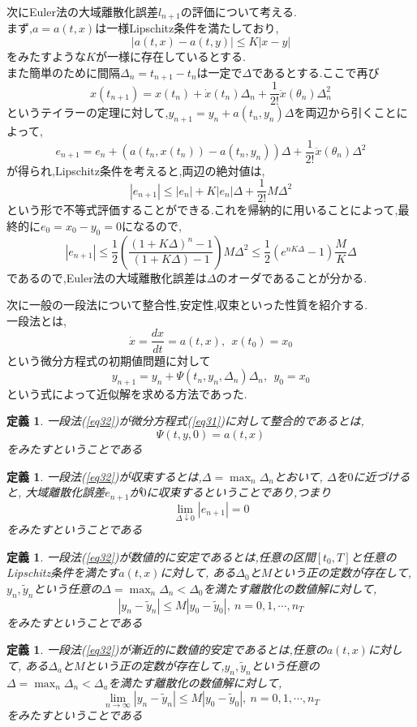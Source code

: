 \documentclass[a4paper]{jreport}
\numberwithin{equation}{section}
\newtheorem{Def}     [Thm]{定義}
\renewenvironment{leftbar}{%
  \def\FrameCommand{\vrule width 1pt \hspace{10pt}}%
  \MakeFramed {\advance\hsize-\width \FrameRestore}}%
 {\endMakeFramed}
\def\defb{\begin{leftbar}\begin{Def}}
\def\defx{\end{Def}\end{leftbar}}
\def\eq{\begin{equation}}
\def\eqx{\end{equation}}
\begin{document}
次にEuler法の大域離散化誤差$l_{n+1}$の評価について考える.\\
まず,$a=a(t,x)$は一様Lipschitz条件を満たしており,
\[
|a(t,x) - a(t,y)| \le K |x-y|
\]
をみたすような$K$が一様に存在しているとする.\\
また簡単のために間隔$\Delta_n = t_{n+1} -t_n$は一定で$\Delta$であるとする.ここで再び
\[
x(t_{n+1}) = x(t_n) + \dot{x}(t_n)\Delta_n + \frac{1}{2!} \ddot{x}(\theta_n)\Delta_n^2
\]
というテイラーの定理に対して,$y_{n+1} = y_n + a(t_n,y_n)\Delta $を両辺から引くことによって,
\[
e_{n+1} = e_n + (a(t_n,x(t_n))-a(t_n,y_n))\Delta + \frac{1}{2!} \ddot{x}(\theta_n)\Delta^2
\]
が得られ,Lipschitz条件を考えると,両辺の絶対値は,
\[
|e_{n+1}| \le |e_n| + K|e_n|\Delta + \frac{1}{2!} M\Delta^2
\]
という形で不等式評価することができる.これを帰納的に用いることによって,最終的に$e_0 = x_0 - y_0 = 0$になるので,
\[
|e_{n+1}| \le \frac{1}{2} \left( \frac{(1+K\Delta)^n -1 }{(1+K\Delta)-1} \right)M\Delta^2 \le
\frac{1}{2} (e^{nK\Delta} -1) \frac{M}{K}\Delta
\]
であるので,Euler法の大域離散化誤差は$\Delta$のオーダであることが分かる.\par
次に一般の一段法について整合性,安定性,収束といった性質を紹介する.\\
一段法とは,
\eq
\label{eq31}
\dot{x} = \frac{dx}{dt} = a(t,x), \  \  x(t_0) = x_0
\eqx
という微分方程式の初期値問題に対して
\eq
\label{eq32}
y_{n+1} = y_n + \Psi(t_n,y_n,\Delta_n) \Delta_n,\  \  y_0 = x_0
\eqx
という式によって近似解を求める方法であった.\\
\defb
一段法(\ref{eq32})が微分方程式(\ref{eq31})に対して整合的であるとは,\\
\[
\Psi(t,y,0)  = a(t,x)
\]
をみたすということである
\defx

\defb
一段法(\ref{eq32})が収束するとは,$\Delta =\max_n \Delta_n$とおいて, $\Delta$を$0$に近づけると,
大域離散化誤差$e_{n+1}$が$0$に収束するということであり,つまり\\
\[
\lim_{\Delta \downarrow 0} |e_{n+1}| = 0
\]
をみたすということである
\defx

\defb
一段法(\ref{eq32})が数値的に安定であるとは,任意の区間$[t_0,T]$と任意のLipschitz条件を満たす$a(t,x)$に対して,
ある$\Delta_0$と$M$という正の定数が存在して,$y_n,\tilde{y}_n$という任意の$\Delta =\max_n \Delta_n < \Delta_0$を満たす離散化の数値解に対して,
\[
|y_n - \tilde{y}_n | \le M |y_0 - \tilde{y}_0| ,\ n = 0,1,\cdots,n_T
\]
をみたすということである
\defx

\defb
一段法(\ref{eq32})が漸近的に数値的安定であるとは,任意の$a(t,x)$に対して,
ある$\Delta_a$と$M$という正の定数が存在して,$y_n,\tilde{y}_n$という任意の$\Delta =\max_n \Delta_n < \Delta_a$を満たす離散化の数値解に対して,
\[
\lim_{n\to\infty}|y_n - \tilde{y}_n | \le M |y_0 - \tilde{y}_0| ,\ n = 0,1,\cdots,n_T
\]
をみたすということである
\defx
\end{document}
